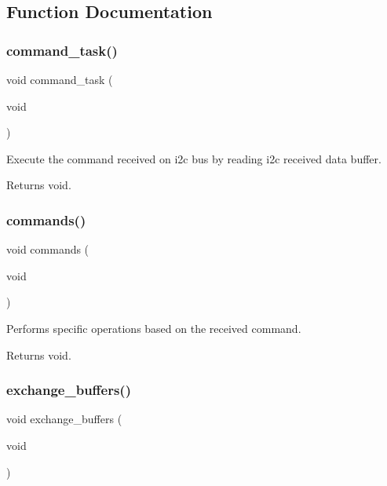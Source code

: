 \subsection{Function Documentation}
\mbox{\label{i2c-rain_8h_a9f32a4169471a435e9364460d7b1761d}} 
\subsubsection{\texorpdfstring{command\+\_\+task()}{command\_task()}}
{\footnotesize\ttfamily void command\+\_\+task (\begin{DoxyParamCaption}\item[{void}]{ }\end{DoxyParamCaption})}



Execute the command received on i2c bus by reading i2c received data buffer. 

\begin{DoxyReturn}{Returns}
void. 
\end{DoxyReturn}
\mbox{\label{i2c-rain_8h_aaad2f6556489c51f2c24302e2cb4188a}} 
\subsubsection{\texorpdfstring{commands()}{commands()}}
{\footnotesize\ttfamily void commands (\begin{DoxyParamCaption}\item[{void}]{ }\end{DoxyParamCaption})}



Performs specific operations based on the received command. 

\begin{DoxyReturn}{Returns}
void. 
\end{DoxyReturn}
\mbox{\label{i2c-rain_8h_aafa3d59a1bde3085849eee08f110612f}} 
\subsubsection{\texorpdfstring{exchange\+\_\+buffers()}{exchange\_buffers()}}
{\footnotesize\ttfamily void exchange\+\_\+buffers (\begin{DoxyParamCaption}\item[{void}]{ }\end{DoxyParamCaption})}



